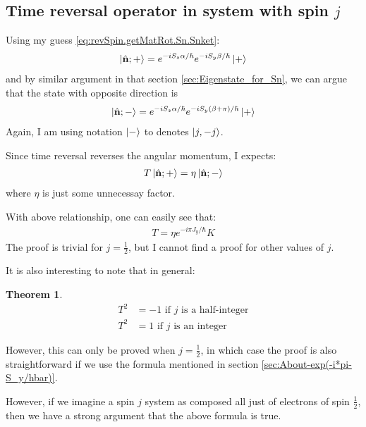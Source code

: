 \documentclass{article}
\numberwithin{equation}{subsection} %
\newtheorem{thm}{Theorem}[section]
\theoremstyle{definition}
\begin{document}
    
    \subsection{Time reversal operator in system with spin 
    \texorpdfstring{$j$}{}}
    \label{sec:Time-reversal-operator-in-spin-j}
    Using my guess \ref{eq:revSpin.getMatRot.Sn.Snket}:
    \begin{align*}
        \ket{\hat{\mathbf{n}};+}= e^{-iS_z \alpha/\hbar}
        e^{-iS_y \beta/\hbar} \ket{+}
    \end{align*}
    and by similar argument in that section \ref{sec:Eigenstate_for_Sn},
    we can argue that the state with opposite direction is
    \begin{align}
        \ket{\hat{\mathbf{n}};-}= e^{-iS_z \alpha/\hbar}
        e^{-iS_y (\beta+\pi)/\hbar} \ket{+}
    \end{align}
    Again, I am using notation $\ket{-}$ to denotes $\ket{j,-j}$.
    
    Since time reversal reverses the angular momentum, I expects:
    \begin{align}
        T \ket{\hat{\mathbf{n}};+} = \eta \ket{\hat{\mathbf{n}};-}
    \end{align}
    where $\eta$ is just some unnecessay factor.

    With above relationship, one can easily see that:
    \begin{align}
        T = \eta e^{-i\pi J_y/\hbar}K
    \end{align}
    The proof is trivial for $j=\frac{1}{2}$, but I cannot find a proof
    for other values of $j$.

    It is also interesting to note that in general:
    \begin{thm} \begin{align}
        \label{eq:TRoper.TRoper.square_minus}
        T^2 &= -1 \text{ if $j$ is a half-integer} \\
        T^2 &= 1 \text{ if $j$ is an integer}
        \label{eq:TRoper.TRoper.square_plus}
    \end{align} \end{thm}
    However, this can only be proved when $j=\frac{1}{2}$, in which case
    the proof is also straightforward if we use the formula mentioned in
    section \ref{sec:About-exp(-i*pi-S_y/hbar)}.
    
    However, if we imagine a spin $j$ system as composed all just of
    electrons of spin $\frac{1}{2}$, then we have a strong argument that
    the above formula is true.
\end{document}

